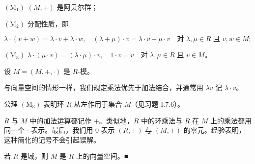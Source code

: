 $ (\mathrm{M}_{1}) $ $ (M,+) $ 是阿贝尔群；

$ (\mathrm{M}_{2}) $ 分配性质，即

\[
\lambda\cdot(v+w) = \lambda\cdot v + \lambda\cdot w , \quad (\lambda+\mu)\cdot v = \lambda\cdot v + \mu\cdot v \quad \text{对 } \lambda,\mu \in R \text{ 且 } v,w \in M ;
\]

$ (\mathrm{M}_{3}) $ $ \lambda\cdot(\mu\cdot v) = (\lambda\cdot\mu)\cdot v , \quad 1\cdot v = v \quad \text{对 } \lambda,\mu \in R \text{ 且 } v \in M $。

\begin{remark}

设 $ M = (M,+,\cdot) $ 是 $ R $-模。

\begin{items}
\item

与向量空间的情形一样，我们规定乘法优先于加法结合，并通常用 $ \lambda v $ 记 $ \lambda\cdot v $。

\item

公理 $ (\mathrm{M}_{3}) $ 表明环 $ R $ 从左作用于集合 $ M $（见习题 I.7.6）。

\item

$ R $ 与 $ M $ 中的加法运算都记作 $ + $。类似地，$ R $ 中的环乘法与 $ R $ 在 $ M $ 上的乘法都用同一个 $ \cdot $ 表示。最后，我们用 0 表示 $ (R,+) $ 与 $ (M,+) $ 的零元。经验表明，这种简化的记号不会引起误解。

\item

若 $ R $ 是域，则 $ M $ 是 $ R $ 上的向量空间。\nobreak\hspace{0.35em}■

\end{items}

\end{remark}

